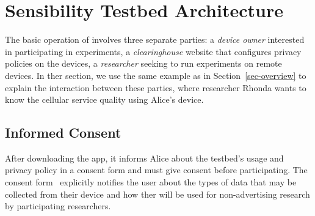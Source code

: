 \section{Sensibility Testbed Architecture}\label{sec-design}

The basic operation of \sysname involves three separate 
parties: a \textit{device owner} interested in participating in 
experiments, a \textit{clearinghouse} website that configures privacy policies on the 
devices,  a \textit{researcher} seeking to run experiments on 
remote devices. 
In ther section, we use the same example as in 
Section~\ref{sec-overview} to explain the interaction between these 
parties, where researcher Rhonda wants to know the cellular service quality 
using Alice's device.


\subsection{Informed Consent}\label{subsec:informed-consent}

After downloading the app, it informs Alice about the testbed's usage and 
privacy policy in a consent form and must give consent before participating.
The consent form~\cite{consent} explicitly notifies the user about the 
types of data that may be collected from their device and how ther will
be used for non-advertising research by participating researchers.

